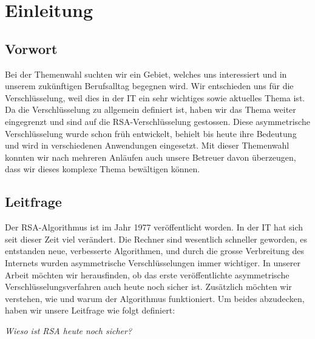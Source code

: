 \section{Einleitung}
\subsection{Vorwort}
Bei der Themenwahl suchten wir ein Gebiet, welches uns interessiert und in unserem zukünftigen Berufsalltag begegnen wird. Wir entschieden uns für die Verschlüsselung, weil dies in der IT ein sehr wichtiges sowie aktuelles Thema ist. Da die Verschlüsselung zu allgemein definiert ist, haben wir das Thema weiter eingegrenzt und sind auf die RSA-Verschlüsselung gestossen. Diese asymmetrische Verschlüsselung wurde schon früh entwickelt, behielt bis heute ihre Bedeutung und wird in verschiedenen Anwendungen eingesetzt. Mit dieser Themenwahl konnten wir nach mehreren Anläufen auch unsere Betreuer davon überzeugen, dass wir dieses komplexe Thema bewältigen können. 
%
\subsection{Leitfrage}
Der RSA-Algorithmus ist im Jahr 1977 veröffentlicht worden. In der IT hat sich seit dieser Zeit viel verändert. Die Rechner sind wesentlich schneller geworden, es entstanden neue, verbesserte Algorithmen, und durch die grosse Verbreitung des Internets wurden asymmetrische Verschlüsselungen immer wichtiger. In unserer Arbeit möchten wir herausfinden, ob das erste veröffentlichte asymmetrische Verschlüsselungsverfahren auch heute noch sicher ist. Zusätzlich möchten wir verstehen, wie und warum der Algorithmus funktioniert. Um beides abzudecken, haben wir unsere Leitfrage wie folgt definiert:\\
\begin{center}\textit{Wieso ist RSA heute noch sicher?}\end{center}
